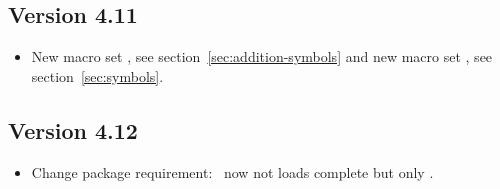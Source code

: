 \documentclass[load-preamble+]{cnltx-doc}
\begin{document}
\subsection{Version 4.11}
\begin{itemize}
  \item New macro set , see
    section~\ref{sec:addition-symbols}  and new macro set ,
    see section~\ref{sec:symbols}.
\end{itemize}

\subsection{Version 4.12}
\begin{itemize}
  \item Change package requirement: \chemformula\ now not loads complete
     but only .
\end{itemize}
\end{document}
